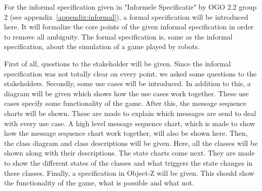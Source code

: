 For the informal specification given in "Informele Specificatie" by OGO 2.2 group 2 (see appendix~\ref{appendix:informal}), a formal specification will be introduced here. It will formalize the core points of the given informal specification in order to remove all ambiguity. The formal specification is, same as the informal specification, about the simulation of a game played by robots.

First of all, questions to the stakeholder will be given. Since the informal specification was not totally clear on every point, we asked some questions to the stakeholders.
Secondly, some use cases will be introduced. In addition to this, a diagram will be given which shows how the use cases work together. These use cases specify some functionality of the game.
After this, the message sequence charts will be shown. These are made to explain which messages are send to deal with every use case. A high level message sequence chart, which is made to show how the message sequence chart work together, will also be shown here.
Then, the class diagram and class descriptions will be given. Here, all the classes will be shown along with their descriptions.
The state charts come next. They are made to show the different states of the classes and what triggers the state changes in these classes. 
Finally, a specification in Object-Z will be given. This should show the functionality of the game, what is possible and what not. 

